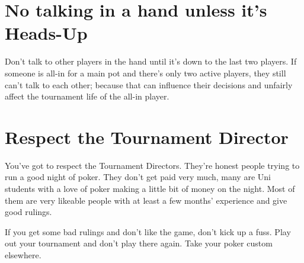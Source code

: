 \section{No talking in a hand unless it's Heads-Up}

Don't talk to other players in the hand until it's down to the last
two players. If someone is all-in for a main pot and there's only two
active players, they still can't talk to each other; because that can
influence their decisions and unfairly affect the tournament life of
the all-in player.

\section{Respect the Tournament Director}

You've got to respect the Tournament Directors. They're honest
people trying to run a good night of poker. They don't get paid very much,
many are Uni students with a love of poker making a little bit of money
on the night. Most of them are very likeable people with at least a 
few months' experience and give good rulings.

If you get some bad rulings and don't like the game, don't kick up a fuss.
Play out your tournament and don't play there again. Take your poker
custom elsewhere.

